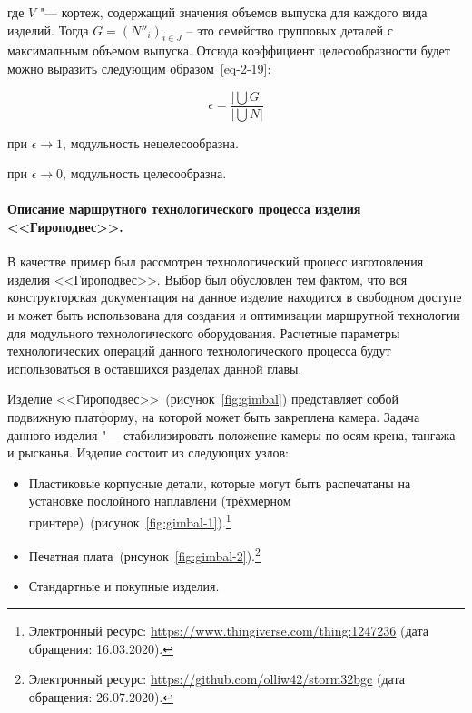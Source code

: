 %

\noindent где $V$ "--- кортеж, содержащий значения объемов выпуска для каждого вида изделий. Тогда $G=({N''}_i)_{i \in J}$ -- это семейство групповых деталей с максимальным объемом выпуска.
Отсюда коэффициент целесообразности будет можно выразить следующим образом~\cref{eq-2-19}:

\begin{equation}
\epsilon = \frac{\big|\bigcup G \big|}{\big|\bigcup N \big|}
\label{eq-2-19}
\end{equation}

\noindent при $\epsilon \rightarrow 1$, модульность нецелесообразна.

\noindent при $\epsilon \rightarrow 0$, модульность целесообразна.

\paragraph{Описание маршрутного технологического процесса изделия <<Гироподвес>>.}

В качестве пример был рассмотрен технологический процесс изготовления изделия <<Гироподвес>>. Выбор был обусловлен тем фактом, что вся конструкторская документация на данное изделие находится в свободном доступе и может быть использована для создания и оптимизации маршрутной технологии для модульного технологического оборудования. Расчетные параметры технологических операций данного технологического процесса будут использоваться в оставшихся разделах данной главы.

Изделие <<Гироподвес>>~(рисунок~\cref{fig:gimbal}) представляет собой подвижную платформу, на которой может быть закреплена камера. Задача данного изделия "--- стабилизировать положение камеры по осям крена, тангажа и рысканья. Изделие состоит из следующих узлов:

\begin{itemize}
	\item Пластиковые корпусные детали, которые могут быть распечатаны на установке послойного наплавлени (трёхмерном принтере)~(рисунок~\cref{fig:gimbal-1}).\footnote{Электронный ресурс: \url{https://www.thingiverse.com/thing:1247236} (дата обращения: 16.03.2020).} 
	\item Печатная плата~(рисунок~\cref{fig:gimbal-2}).\footnote{Электронный ресурс: \url{https://github.com/olliw42/storm32bgc} (дата обращения: 26.07.2020).}
	\item Стандартные и покупные изделия.
\end{itemize}


